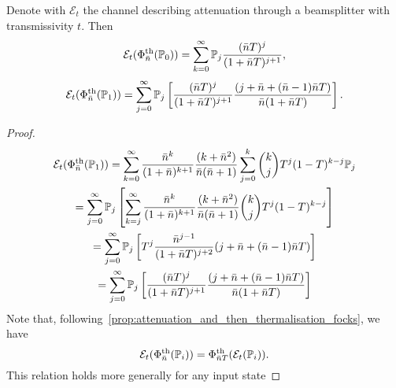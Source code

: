 \documentclass[12pt]{report}
\newcommand{\PP}{\mathbb{P}}
\newcommand{\calE}{{\mathcal{E}}}
\begin{document}
\begin{prop}
	Denote with $\calE_t$ the channel describing attenuation through a beamsplitter with transmissivity $t$. Then
	\begin{equation}
		\calE_t(\Phi_{\bar n}^{\rm th}(\PP_0))
		= \sum_{k=0}^\infty \PP_j
		\frac{(\bar n T)^j}{(1+\bar n T)^{j+1}},
	\end{equation}
	\begin{equation}
		\calE_t(\Phi_{\bar n}^{\rm th}(\PP_1))
		= \sum_{j=0}^\infty \PP_j \left[
		\frac{(\bar n T)^j}{(1+\bar n T)^{j+1}}
		\frac{(j + \bar n + (\bar n-1)\bar nT)}{\bar n(1+\bar nT)}
		\right].
	\end{equation}
\end{prop}
\begin{proof}
	\begin{equation}
	\begin{gathered}
		\calE_t(\Phi_{\bar n}^{\rm th}(\PP_1))
		= \sum_{k=0}^\infty
		\frac{\bar n^k}{(1+\bar n)^{k+1}}
		\frac{(k+\bar n^2)}{\bar n(\bar n+1)}
		\sum_{j=0}^k
		\binom{k}{j} T^j (1-T)^{k-j} \PP_j \\
		= \sum_{j=0}^\infty \PP_j
		\left[
		\sum_{k=j}^\infty 
		\frac{\bar n^k}{(1+\bar n)^{k+1}}
		\frac{(k+\bar n^2)}{\bar n(\bar n+1)}
		\binom{k}{j} T^j (1-T)^{k-j}
		\right] \\
		= \sum_{j=0}^\infty \PP_j \left[
		T^j \frac{\bar n^{j-1}}{(1+\bar n T)^{j+2}}
		(j + \bar n + (\bar n-1)\bar nT)
		\right] \\
		= \sum_{j=0}^\infty \PP_j \left[
		\frac{(\bar n T)^j}{(1+\bar n T)^{j+1}}
		\frac{(j + \bar n + (\bar n-1)\bar nT)}{\bar n(1+\bar nT)}
		\right]
	\end{gathered}
	\end{equation}
	Note that, following~\cref{prop:attenuation_and_then_thermalisation_focks}, we have
	\begin{equation}
		\calE_t(\Phi_{\bar n}^{\rm th}(\PP_i))
		= \Phi^{\rm th}_{\bar nT}(\calE_t(\PP_i)).
	\end{equation}
	This relation holds more generally for any input state 
\end{proof}
\end{document}
